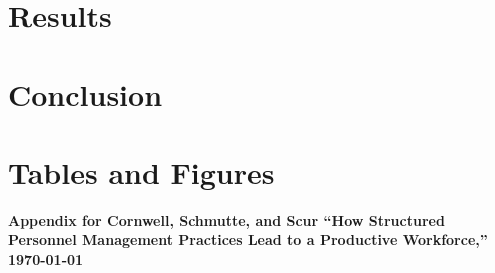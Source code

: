 \documentclass[12pt]{article}
\renewcommand{\thetable}{\Roman{table}}
\newcommand{\mytitle}{How Structured Personnel Management Practices Lead to a Productive Workforce}
\begin{document}
	\section{Results} 
	\label{sec:findings}
	

	\section{Conclusion} 
	\label{sec:conclusion}
	

	\newpage
	
	

	\clearpage
	\section*{Tables and Figures}
	\label{app:tables_figures}
	
	

\clearpage
\begin{center}
{\bf Appendix for Cornwell, Schmutte, and Scur ``\mytitle,'' \today}
\end{center}



	\appendix 
	\setcounter{table}{0}
	\setcounter{figure}{0}
	\renewcommand\thetable{\Alph{section}.\arabic{table}}
	\renewcommand\thefigure{\Alph{section}.\arabic{figure}}
	\renewcommand\theequation{\Alph{section}.\arabic{equation}}
	
\end{document}
